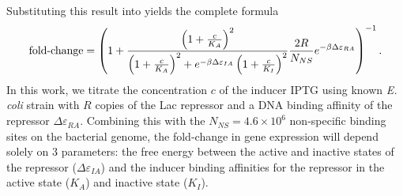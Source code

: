 Substituting this result into \eref[eq5] yields the
complete formula
\begin{equation}\label{eq7}
\operatorname{fold-change}= \left(
1+\frac{\left(1+\frac{c}{K_A}\right)^2}{\left(1+\frac{c}{K_A}\right)^2+e^{-\beta  \Delta \varepsilon_{IA} }\left(1+\frac{c}{K_I}\right)^2}\frac{2 R}{N_{NS}}e^{-\beta \Delta\varepsilon_{RA}} \right)^{-1}.
\end{equation}
In this work, we titrate the concentration \(c\) of the inducer IPTG using known
\textit{E. coli} strain with \(R\) copies of the Lac repressor and a DNA binding
affinity of the repressor $\Delta\varepsilon_{RA}$. Combining this with the
$N_{NS} = 4.6 \times 10^6$ non-specific binding sites on the bacterial genome,
the fold-change in gene expression will depend solely on 3 parameters: the free
energy between the active and inactive states of the repressor
($\Delta\varepsilon_{IA}$) and the inducer binding affinities for the repressor
in the active state ($K_A$) and inactive state ($K_I$).



